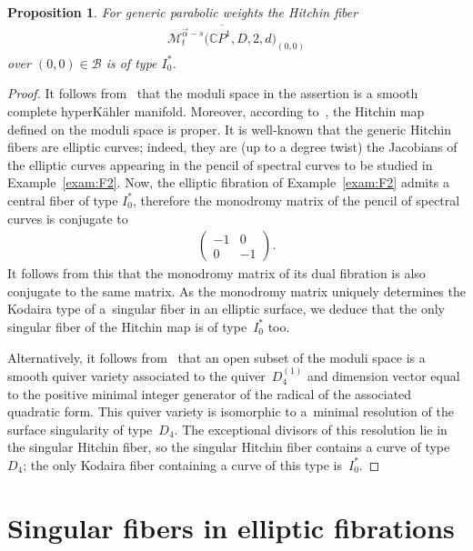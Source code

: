 \documentclass[pdftex]{sigma}
\newcommand{\CP}[1]{\mathbb{C}P^{#1}} %
\newcommand{\Mod}{{\mathcal M}} %
\numberwithin{equation}{section}
\newtheorem{prop}{Proposition}[section]
\begin{document}
\begin{prop}\label{prop:Hitchin_fiber}
For generic parabolic weights the Hitchin fiber
\begin{gather*}
 \overline{\Mod_t^{\vec{\alpha}-s} \big(\CP1, D, 2, d\big)}_{(0,0)}
\end{gather*}
over $(0,0) \in \mathcal{B}$ is of type $I_0^*$.
\end{prop}

\begin{proof}It follows from~\cite[Theorem~0.2]{BB} that the moduli space in the assertion is a smooth complete hyperK\"ahler manifold.
Moreover, according to~\cite[Lemma~1]{Sz_PW}, the Hitchin map defined on the moduli space is proper.
It is well-known that the generic Hitchin fibers are elliptic curves; indeed, they are (up to a degree twist) the Jacobians of the elliptic curves
appearing in the pencil of spectral curves to be studied in Example~\ref{exam:F2}.
Now, the elliptic fibration of Example~\ref{exam:F2} admits a central fiber of type $I_0^*$, therefore the monodromy matrix
of the pencil of spectral curves is conjugate to
\begin{gather*}
 \begin{pmatrix}
 -1 & 0 \\
 0 & -1
 \end{pmatrix}.
\end{gather*}
It  follows from this that the monodromy matrix of its dual fibration is also conjugate to the same matrix. As the monodromy matrix uniquely determines the Kodaira type of a~singular fiber in an elliptic surface, we deduce that the only singular fiber of the Hitchin map is of type~$I_0^*$ too.

Alternatively, it follows from~\cite{CB} that an open subset of the moduli space is a smooth quiver variety associated to the quiver~$D_4^{(1)}$ and
dimension vector equal to the positive minimal integer generator of the radical of the associated quadratic form.
This quiver variety is isomorphic to a~minimal resolution of the surface singularity of type~$D_4$.
The exceptional divisors of this resolution lie in the singular Hitchin fiber, so the singular Hitchin fiber contains a curve of type~$D_4$;
the only Kodaira fiber containing a curve of this type is~$I_0^*$.
\end{proof}

\section{Singular fibers in elliptic fibrations} \label{sec:elliptic}
\end{document}
